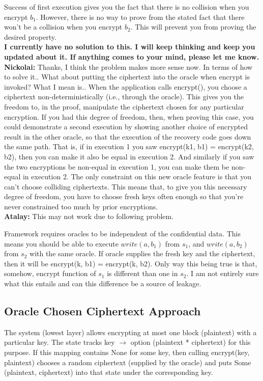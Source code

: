 \documentclass[onecolumn]{paper}
\begin{document}
		Success of first execution gives you the fact that there is no collision when you encrypt $b_1$. However, there is no way to prove from the stated fact that there won't be a collision when you encrypt $b_2$. This will prevent you from proving the desired property.\\
		
		{\bf I currently have no solution to this. I will keep thinking and keep you updated about it. If anything comes to your mind, please let me know.}\\
		 
		{\color{red} \bf Nickolai:} Thanks, I think the problem makes more sense now.
		In terms of how to solve it..  What about putting the ciphertext into the oracle when encrypt is invoked?
		What I mean is..  When the application calls encrypt(), you choose a ciphertext non-deterministically (i.e., through the oracle).  This gives you the freedom to, in the proof, manipulate the ciphertext chosen for any particular encryption.
		If you had this degree of freedom, then, when proving this case, you could demonstrate a second execution by showing another choice of encrypted result in the other oracle, so that the execution of the recovery code goes down the same path.
		That is, if in execution 1 you saw encrypt(k1, b1) = encrypt(k2, b2), then you can make it also be equal in execution 2.
		And similarly if you saw the two encryptions be non-equal in execution 1, you can make them be non-equal in execution 2.
		The only constraint on this new oracle feature is that you can't choose colliding ciphertexts.
		This means that, to give you this necessary degree of freedom, you have to choose fresh keys often enough so that you're never constrained too much by prior encryptions.\\
		
		{\color{blue} \bf Atalay:} This may not work due to following problem.
		
		Framework requires oracles to be independent of the confidential data. This means you should be able to execute $write(a, b_1)$ from $s_1$, and $write(a, b_2)$ from $s_2$ with the same oracle. If oracle supplies the fresh key and the ciphertext, then it will be encrypt(k, b1) = encrypt(k, b2). Only way this being true is that, somehow, encrypt function of $s_1$ is different than one in $s_2$. I am not entirely sure what this entails and can this difference be a source of leakage.
		
		
		\subsection{Oracle Chosen Ciphertext Approach}
		The system (lowest layer) allows encrypting at most one block (plaintext) with a particular key.  The state tracks key $\rightarrow$ option (plaintext * ciphertext) for this purpose.  If this mapping contains None for some key, then calling encrypt(key, plaintext) chooses a random ciphertext (supplied by the oracle) and puts Some (plaintext, ciphertext) into that state under the corresponding key.
		
\end{document}
